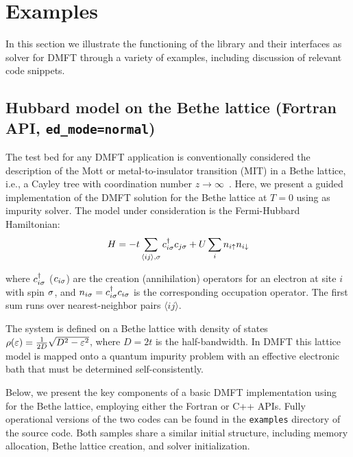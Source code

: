 \documentclass[edipack_sp.tex]{subfiles}
\begin{document}
\section{Examples}\label{SecExamples}
In this section we illustrate the functioning of the \NAME
library and their interfaces as solver for DMFT through a variety of examples, including
discussion of relevant code snippets. 


\subsection{Hubbard model on the Bethe lattice (Fortran API, {\tt ed\_mode=normal})}\label{SecExamplesBetheDMFT}
The test bed for any DMFT application is conventionally considered 
the description of the Mott or metal-to-insulator transition (MIT) 
in a Bethe lattice, i.e., a Cayley tree with coordination number 
$z\to\infty$~\cite{Georges1996}.
Here, we present a guided implementation of the DMFT 
solution for the Bethe lattice at $T=0$ using \NAME as impurity
solver.
The model under consideration is the Fermi-Hubbard Hamiltonian:
$$
H = -t \sum_{\langle ij\rangle,\sigma} c^\dagger_{i\sigma} c_{j\sigma} + 
    U \sum_i n_{i\uparrow}n_{i\downarrow}
    $$
    
where $c^\dagger_{i\sigma}$ ($c_{i\sigma}$) are the creation (annihilation) 
operators for an electron at site $i$ with spin $\sigma$, and 
$n_{i\sigma} = c^\dagger_{i\sigma} c_{i\sigma}$ is the corresponding occupation 
operator. The first sum runs over nearest-neighbor pairs 
$\langle ij \rangle$.

The system is defined on a Bethe lattice with density of states
$\rho(\varepsilon)=\frac{1}{2D}\sqrt{D^2-\varepsilon^2}$,
where $D=2t$ is the half-bandwidth.
In DMFT this lattice model is mapped onto a quantum impurity problem with 
an effective electronic bath that must be determined
self-consistently.

Below, we present the key components of a basic DMFT implementation 
using \NAME for the Bethe lattice, employing either the Fortran or 
C++ APIs. Fully operational versions of the two codes can be found 
in the {\tt examples} directory of the \NAME source code. Both 
samples share a similar initial structure, including memory 
allocation, Bethe lattice creation, and solver initialization.
\end{document}
